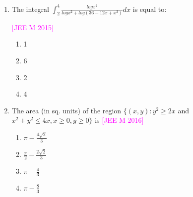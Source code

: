\documentclass[journal,12pt,twocolumn]{IEEEtran}
\theoremstyle{remark}
\begin{document}
\begin{enumerate}[label=\textcolor{magenta}{\arabic*.}]
	\item The integral $\int_2^4\frac{log x^2}{log x^2 + log(36-12x+x^2)}dx$ is equal to:

		\hfill{\textcolor{magenta}{[JEE M 2015]}}

		\begin{multicols}{4}
			\begin{enumerate}[label=(\alph*)]
				\item 1
				\item 6
				\item 2
				\item 4
			\end{enumerate}
		\end{multicols}


	\item The area (in sq. units) of the region $\{(x,y):y^2\geq2x$ and $x^2+y^2\leq4x, x\geq0, y\geq0\}$ is
		\hfill{\textcolor{magenta}{[JEE M 2016]}}

		\begin{multicols}{2}
			\begin{enumerate}[label=(\alph*)]
				\item $\pi-\frac{4\sqrt{2}}{3}$
				\item $\frac{\pi}{2}-\frac{2\sqrt{2}}{3}$
				\item $\pi-\frac{4}{3}$
				\item $\pi-\frac{8}{3}$ 
			\end{enumerate}
		\end{multicols} 
\end{enumerate}
\end{document}
